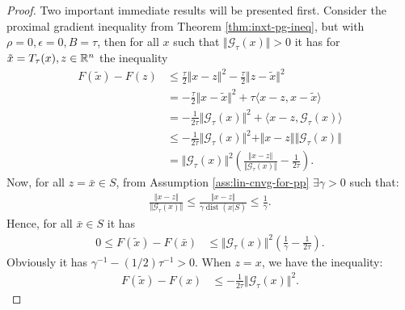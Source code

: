 \documentclass[12pt]{article}
\DeclareMathOperator{\dist}{\mathop{dist}}
\begin{document}
        \begin{proof}
            Two important immediate results will be presented first.
            Consider the proximal gradient inequality from Theorem \ref{thm:inxt-pg-ineq}, but with $\rho = 0, \epsilon = 0, B = \tau$, then for all $x$ such that $\Vert \mathcal G_\tau(x)\Vert > 0$ it has for $\tilde x = T_{\tau}(x), z \in \mathbb R^n$ the inequality 
            \begin{align*}
                F(\tilde x) - F(z) 
                &\le 
                \frac{\tau}{2}\Vert x - z\Vert^2 - \frac{\tau}{2}\Vert z - \tilde x\Vert^2
                \\
                &=  
                - \frac{\tau}{2}\Vert x - \tilde x\Vert^2
                + \tau\langle x - z, x - \tilde x\rangle
                \\
                &=  - \frac{1}{2\tau}\Vert \mathcal G_\tau(x) \Vert^2
                + \langle x - z, \mathcal G_\tau(x)\rangle
                \\
                &\le  - \frac{1}{2\tau}\Vert \mathcal G_\tau(x)\Vert^2 
                + \Vert x - z\Vert \Vert \mathcal G_\tau(x)\Vert
                \\
                &=
                \Vert \mathcal G_\tau(x)\Vert^2\left(
                    \frac{\Vert x - z \Vert}{\Vert \mathcal G_\tau(x)\Vert} - \frac{1}{2\tau}
                \right). 
            \end{align*}
            Now, for all $z = \bar x \in S$, from Assumption \ref{ass:lin-cnvg-for-pp} $\exists \gamma > 0$ such that: 
            \begin{align*}
                \frac{\Vert x - z \Vert}{\Vert \mathcal G_\tau(x)\Vert}
                \le 
                \frac{\Vert x - z \Vert}{\gamma \dist(x | S)} \le \frac{1}{\gamma}. 
            \end{align*}
            Hence, for all $\bar x \in S$ it has 
            \begin{align}\label{ineq:lin-cnvg-ista-eb-pitem1}
                0\le F(\tilde x) - F(\bar x)&\le 
                \Vert \mathcal G_\tau(x)\Vert^2\left(
                    \frac{1}{\gamma} - \frac{1}{2\tau}
                \right). 
            \end{align}
            Obviously it has $\gamma^{-1} - (1/2)\tau^{-1} > 0$. 
            When $z = x$, we have the inequality: 
            \begin{align}\label{ineq:lin-cnvg-ista-eb-pitem2}
                F(\tilde x) - F(x) &\le - \frac{1}{2\tau}\Vert \mathcal G_\tau(x)\Vert^2. 

\end{align}
\end{proof}
\end{document}
